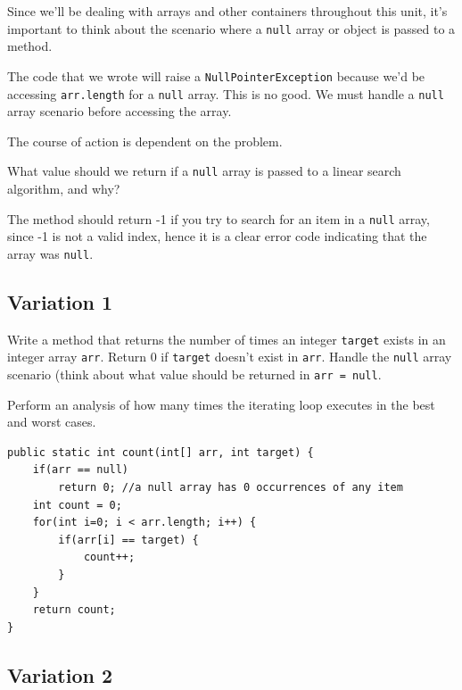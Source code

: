 Since we'll be dealing with arrays and other containers throughout this unit, it's important to think about the scenario where a \texttt{null} array or object is passed to a method. 

The code that we wrote will raise a \texttt{NullPointerException} because we'd be accessing \texttt{arr.length} for a \texttt{null} array. This is no good. We must handle a \texttt{null} array scenario before accessing the array.

The course of action is dependent on the problem.

\begin{exercise}
What value should we return if a \texttt{null} array is passed to a linear search algorithm, and why?
\end{exercise}

\begin{answer}
The method should return -1 if you try to search for an item in a \texttt{null} array, since -1 is not a valid index, hence it is a clear error code indicating that the array was \texttt{null}. 
\end{answer}

\subsection{Variation 1}

\begin{exercise}
Write a method that returns the number of times an integer \texttt{target} exists in an integer array \texttt{arr}. Return 0 if \texttt{target} doesn't exist in \texttt{arr}. Handle the \texttt{null} array scenario (think about what value should be returned in \texttt{arr = null}.

Perform an analysis of how many times the iterating loop executes in the best and worst cases.
\end{exercise}
\begin{answer}
\begin{lstlisting}
public static int count(int[] arr, int target) {
	if(arr == null)
		return 0; //a null array has 0 occurrences of any item
	int count = 0;
	for(int i=0; i < arr.length; i++) {
		if(arr[i] == target) {
			count++;
		}
	}
	return count;
}
\end{lstlisting}	
\bigoh[n][n]
\end{answer}

\subsection{Variation 2}

